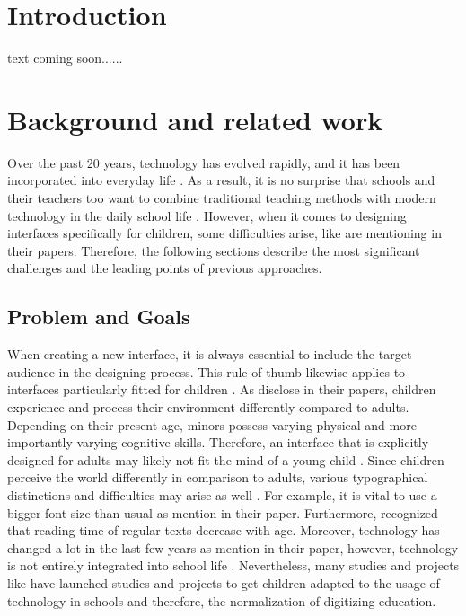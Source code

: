 \section{Introduction}
\label{section:Introduction}
text coming soon......

\section{Background and related work}
\label{section:RelatedWork}
Over the past 20 years, technology has evolved rapidly, and it has been incorporated into everyday life \autocite{sharmin2012effect, walker2000screen}. As a result, it is no surprise that schools and their teachers too want to combine traditional teaching methods with modern technology in the daily school life \autocite{lozano2016dedigitalizing}. However, when it comes to designing interfaces specifically for children, some difficulties arise, like \textcite{boyd2015evaluating, gan2015enhancing} are mentioning in their papers. Therefore, the following sections describe the most significant challenges and the leading points of previous approaches.

\subsection{Problem and Goals}
\label{subsection:ProblemGoals}
When creating a new interface, it is always essential to include the target audience in the designing process. This rule of thumb likewise applies to interfaces particularly fitted for children \autocite[]{gossen2012search, alhussayen2015evaluating}. As \textcite[]{gossen2012search, alhussayen2015evaluating} disclose in their papers, children experience and process their environment differently compared to adults. Depending on their present age, minors possess varying physical and more importantly varying cognitive skills. Therefore, an interface that is explicitly designed for adults may likely not fit the mind of a young child \autocite[]{alhussayen2015evaluating}.
Since children perceive the world differently in comparison to adults, various typographical distinctions and difficulties may arise as well \autocite{adattil2018effects}. For example, it is vital to use a bigger font size than usual as  \textcite{adattil2018effects} mention in their paper. Furthermore,  \textcite{adattil2018effects} recognized that reading time of regular texts decrease with age. 
Moreover, technology has changed a lot in the last few years as \textcite{liu2005reading} mention in their paper, however, technology is not entirely integrated into school life \autocite{engen2014ipads}. Nevertheless, many studies and projects like \textcite{walker2000screen, kerawalla2006making, engen2014ipads} have launched studies and projects to get children adapted to the usage of technology in schools and therefore, the normalization of digitizing education.

